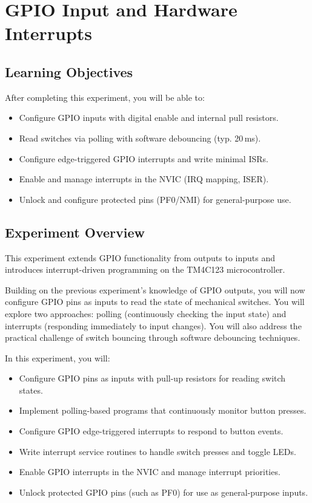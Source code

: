 \chapter{GPIO Input and Hardware Interrupts}

\section*{Learning Objectives}
After completing this experiment, you will be able to:
\begin{itemize}[nosep]
  \item Configure GPIO inputs with digital enable and internal pull resistors.
  \item Read switches via polling with software debouncing (typ. 20\,ms).
  \item Configure edge-triggered GPIO interrupts and write minimal ISRs.
  \item Enable and manage interrupts in the NVIC (IRQ mapping, ISER).
  \item Unlock and configure protected pins (PF0/NMI) for general-purpose use.
\end{itemize}


\section*{Experiment Overview}
This experiment extends GPIO functionality from outputs to inputs and introduces interrupt-driven programming on the TM4C123 microcontroller.

\noindent Building on the previous experiment's knowledge of GPIO outputs, you will now configure GPIO pins as inputs to read the state of mechanical switches. You will explore two approaches: polling (continuously checking the input state) and interrupts (responding immediately to input changes). You will also address the practical challenge of switch bouncing through software debouncing techniques.

\noindent In this experiment, you will:
\begin{itemize}[nosep]
  \item Configure GPIO pins as inputs with pull-up resistors for reading switch states.
  \item Implement polling-based programs that continuously monitor button presses.
  \item Configure GPIO edge-triggered interrupts to respond to button events.
  \item Write interrupt service routines to handle switch presses and toggle LEDs.
  \item Enable GPIO interrupts in the NVIC and manage interrupt priorities.
  \item Unlock protected GPIO pins (such as PF0) for use as general-purpose inputs.
\end{itemize}


